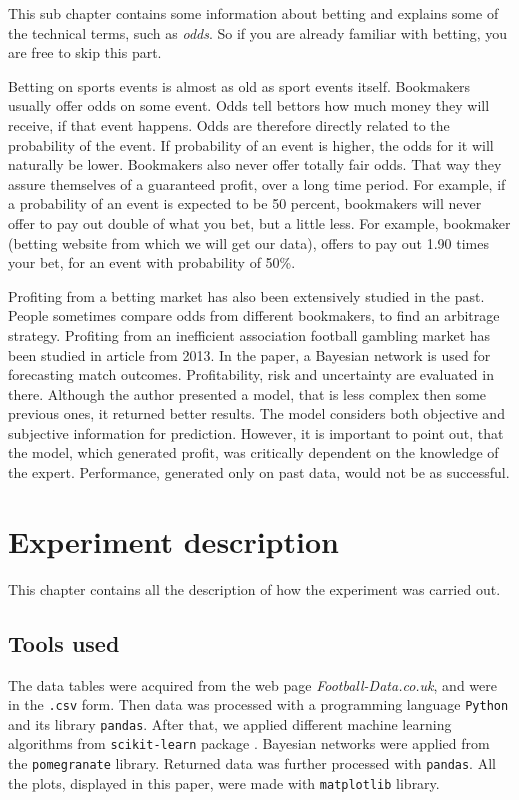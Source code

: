 \documentclass[conference]{IEEEtran}
\begin{document}
This sub chapter contains some information about betting and explains some of the technical terms, such as 
\textit{odds}. So if you are already familiar with betting, you are free to skip this part.

Betting on sports events is almost as old as sport events itself. Bookmakers usually offer odds on 
some event. Odds tell bettors how much money they will receive, if that event happens. Odds are therefore 
directly related to the probability of the event. If probability of an event is higher, the odds for it will
naturally be lower. Bookmakers also never offer totally fair odds. That way they assure themselves of a 
guaranteed profit, over a long time period.
For example, if a probability of an event is expected to be 50 percent, bookmakers will never offer to pay 
out double of what you bet, but a little less. For example, bookmaker  (betting website from
which we will get our
data), offers to pay out 1.90 times your bet, for an event with probability of 50\%. 

Profiting from a betting market has also been extensively studied in the past. People sometimes compare odds from
different bookmakers, to find an arbitrage strategy. Profiting from an inefficient association football gambling
market has been studied in article \cite{Constantinou_2013} from 2013. In the paper, a Bayesian network is used
for forecasting match outcomes. Profitability, risk and uncertainty are evaluated in there. Although the author
presented a model, that is less complex then some previous ones, it returned better results. The model considers
both objective and subjective information for prediction.  However, it is important to point out, that the 
model, which generated profit, was critically dependent on the knowledge of the expert. Performance, generated 
only on past data, would not be as successful.

\section{Experiment description}

This chapter contains all the description of how the experiment was carried out.

\subsection{Tools used}

The data tables were acquired from the web page \emph{Football-Data.co.uk}, and were in the \texttt{.csv} form.
Then data was processed with a programming language \texttt{Python} and its library \texttt{pandas}. After 
that, we
applied different machine learning algorithms from \texttt{scikit-learn} package \cite{scikit-learn}. Bayesian networks were applied 
from the \texttt{pomegranate} library. Returned data was further processed 
with \texttt{pandas}. All the plots, displayed in 
this paper, were made with \texttt{matplotlib} library.
\end{document}
